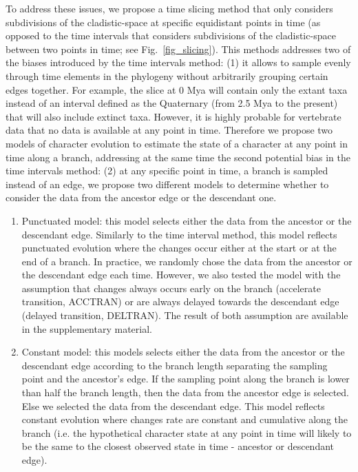 \documentclass[12pt,letterpaper]{article}
\begin{document}
To address these issues, we propose a time slicing method that only considers subdivisions of the cladistic-space at specific equidistant points in time (as opposed to the time intervals that considers  subdivisions of the cladistic-space between two points in time; see Fig.~\ref{fig_slicing}). This methods addresses two of the biases introduced by the time intervals method: (1) it allows to sample evenly through time elements in the phylogeny without arbitrarily grouping certain edges together. For example, the slice at 0 Mya will contain only the extant taxa instead of an interval defined as the Quaternary (from 2.5 Mya to the present) that will also include extinct taxa. However, it is highly probable for vertebrate data that no data is available at any point in time. Therefore we propose two models of character evolution to estimate the state of a character at any point in time along a branch, addressing at the same time the second potential bias in the time intervals method: (2) at any specific point in time, a branch is sampled instead of an edge, we propose two different models to determine whether to consider the data from the ancestor edge or the descendant one.
\begin{enumerate}
\item{Punctuated model:} this model selects either the data from the ancestor or the descendant edge. Similarly to the time interval method, this model reflects punctuated evolution where the changes occur either at the start or at the end of a branch. In practice, we randomly chose the data from the ancestor or the descendant edge each time. However, we also tested the model with the assumption that changes always occurs early on the branch (accelerate transition, ACCTRAN) or are always delayed towards the descendant edge (delayed transition, DELTRAN). The result of both assumption are available in the supplementary material.
\item{Constant model:} this models selects either the data from the ancestor or the descendant edge according to the branch length separating the sampling point and the ancestor's edge. If the sampling point along the branch is lower than half the branch length, then the data from the ancestor edge is selected. Else we selected the data from the descendant edge. This model reflects constant evolution where changes rate are constant and cumulative along the branch (i.e. the hypothetical character state at any point in time will likely to be the same to the closest observed state in time - ancestor or descendant edge).
\end{enumerate}
\end{document}
